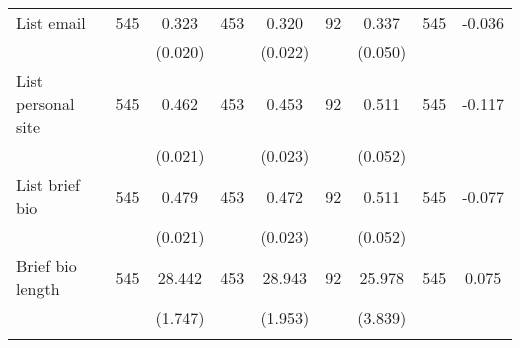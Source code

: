 \begin{tabular}{@{\extracolsep{5pt}}lcccccccc}
List email   & 545    & 0.323    & 453    & 0.320    & 92    & 0.337    & 545    & -0.036   \\
 &   & (0.020)  &   & (0.022)  &   & (0.050)  &   &  \\ [1ex]
List personal site   & 545    & 0.462    & 453    & 0.453    & 92    & 0.511    & 545    & -0.117   \\
 &   & (0.021)  &   & (0.023)  &   & (0.052)  &   &  \\ [1ex]
List brief bio   & 545    & 0.479    & 453    & 0.472    & 92    & 0.511    & 545    & -0.077   \\
 &   & (0.021)  &   & (0.023)  &   & (0.052)  &   &  \\ [1ex]
Brief bio length   & 545    & 28.442    & 453    & 28.943    & 92    & 25.978    & 545    & 0.075   \\
 &   & (1.747)  &   & (1.953)  &   & (3.839)  &   &  \\ [1ex]
\hline \hline \\[-1.8ex]

\end{tabular}

